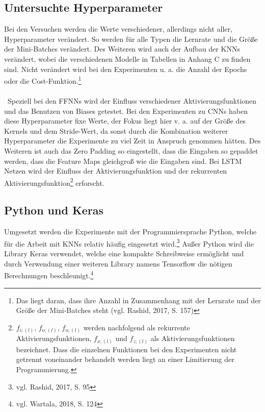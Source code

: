 \documentclass[a4paper,12pt,ngerman,oneside]{scrreprt}	%
\begin{document}
			\subsection{Untersuchte Hyperparameter}
			Bei den Versuchen werden die Werte verschiedener, allerdings nicht aller, Hyperparameter verändert. So werden für alle Typen die Lernrate und die Größe der Mini-Batches verändert. Des Weiteren wird auch der Aufbau der KNNs verändert, wobei die verschiedenen Modelle in Tabellen in Anhang C zu finden sind. Nicht verändert wird bei den Experimenten u. a. die Anzahl der Epochs oder die Cost-Funktion.\footnote{Das liegt daran, dass ihre Anzahl in Zusammenhang mit der Lernrate und der Größe der Mini-Batches steht (vgl. Rashid, 2017, S. 157)} 
			\\ \ \\ \
			Speziell bei den FFNNs wird der Einfluss verschiedener Aktivierungsfunktionen und das Benutzen von Biases getestet. Bei den Experimenten zu CNNs haben diese Hyperparameter fixe Werte, der Fokus liegt hier v. a. auf der Größe des Kernels und dem Stride-Wert, da sonst durch die Kombination weiterer Hyperparameter die Experimente zu viel Zeit in Anspruch genommen hätten. Des Weiteren ist auch das Zero Padding so eingestellt, dass die Eingaben so gepaddet werden, dass die Feature Maps gleichgroß wie die Eingaben sind. Bei LSTM Netzen wird der Einfluss der Aktivierungsfunktion und der rekurrenten Aktivierungsfunktion\footnote{$f_{i;(l)}$, $f_{o;(l)}$, $f_{u;(l)}$ werden nachfolgend als rekurrente Aktivierungsfunktionen, $f_{x;(l)}$ und $f_{z;(l)}$ als Aktivierungsfunktionen bezeichnet. Dass die einzelnen Funktionen bei den Experimenten nicht getrennt voneinander behandelt werden liegt an einer Limitierung der Programmierung.} erforscht.
			
			\subsection{Python und Keras}\label{Python&Keras}
			Umgesetzt werden die Experimente mit der Programmiersprache Python, welche für die Arbeit mit KNNs relativ häufig eingesetzt wird.\footnote{vgl. Rashid, 2017, S. 95} Außer Python wird die Library Keras verwendet, welche eine kompakte Schreibweise ermöglicht und durch Verwendung einer weiteren Library namens Tensorflow die nötigen Berechnungen beschleunigt.\footnote{vgl. Wartala, 2018, S. 124}
\end{document}
